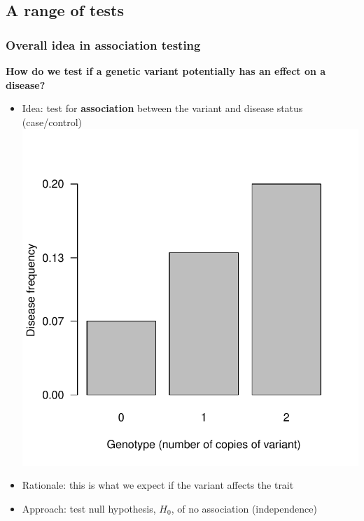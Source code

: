 \documentclass[xcolor=pdftex,dvipsnames,table,10pt]{beamer}
\begin{document}
\subsection{A range of tests}
\begin{frame}
  \frametitle{Overall idea in association testing}
  \vspace{.1cm}  
 \small 
\hspace{-0.4cm}\textbf{How do we test if a genetic variant potentially has an effect on a disease?}\\\vspace{0.0cm}
  \begin{itemize}\setlength{\itemindent}{-2.25em}
    \item<2-> Idea: test for \textbf{association} between the variant and disease status (case/control)\\\vspace{-0.25cm}
        \includegraphics[scale=0.38]{geneticModels7.pdf}\\\vspace{-0cm}
     \item<3-> Rationale: this is what we expect if the variant affects the trait
     \item<4-> Approach: test null hypothesis, $H_0$, of no association (independence)%
        \end{itemize}
\end{frame}
\end{document}
